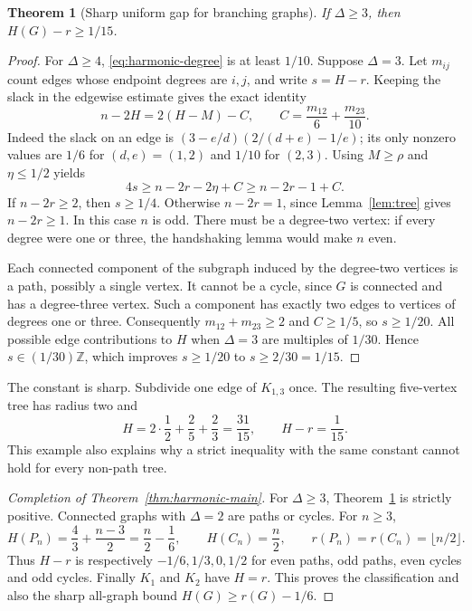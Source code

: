 \documentclass[11pt,a4paper]{article}
\newtheorem{theorem}{Theorem}[section]
\begin{document}
\begin{theorem}[Sharp uniform gap for branching graphs]\label{thm:gap}
If $\Delta\ge3$, then $H(G)-r\ge1/15$.
\end{theorem}
\begin{proof}
For $\Delta\ge4$, \eqref{eq:harmonic-degree} is at least $1/10$.
Suppose $\Delta=3$. Let $m_{ij}$ count edges whose endpoint
degrees are $i,j$, and write $s=H-r$. Keeping the slack in the
edgewise estimate gives the exact identity
\[
n-2H=2(H-M)-C,\qquad
C=\frac{m_{12}}6+\frac{m_{23}}{10}.
\]
Indeed the slack on an edge is
$(3-e/d)(2/(d+e)-1/e)$; its only nonzero values are
$1/6$ for $(d,e)=(1,2)$ and $1/10$ for $(2,3)$.
Using $M\ge\rho$ and $\eta\le1/2$ yields
\[
4s\ge n-2r-2\eta+C\ge n-2r-1+C.
\]
If $n-2r\ge2$, then $s\ge1/4$. Otherwise $n-2r=1$, since
Lemma~\ref{lem:tree} gives $n-2r\ge1$. In this case $n$ is odd.
There must be a degree-two vertex: if every degree were one or
three, the handshaking lemma would make $n$ even.

Each connected component of the subgraph induced by the degree-two
vertices is a path, possibly a single vertex. It cannot be a cycle,
since $G$ is connected and has a degree-three vertex. Such a component
has exactly two edges to vertices of degrees one or three.
Consequently $m_{12}+m_{23}\ge2$ and $C\ge1/5$, so $s\ge1/20$.
All possible edge contributions to $H$ when $\Delta=3$ are multiples
of $1/30$. Hence $s\in(1/30)\mathbb Z$, which improves
$s\ge1/20$ to $s\ge2/30=1/15$.
\end{proof}

The constant is sharp. Subdivide one edge of $K_{1,3}$ once.
The resulting five-vertex tree has radius two and
\[
H=2\cdot\frac12+\frac25+\frac23=\frac{31}{15},
\qquad H-r=\frac1{15}.
\]
This example also explains why a strict inequality with the same
constant cannot hold for every non-path tree.

\begin{proof}[Completion of Theorem~\ref{thm:harmonic-main}]
For $\Delta\ge3$, Theorem~\ref{thm:gap} is strictly positive.
Connected graphs with $\Delta=2$ are paths or cycles. For $n\ge3$,
\[
H(P_n)=\frac43+\frac{n-3}{2}=\frac n2-\frac16,
\qquad H(C_n)=\frac n2,
\qquad r(P_n)=r(C_n)=\lfloor n/2\rfloor.
\]
Thus $H-r$ is respectively $-1/6,1/3,0,1/2$ for even paths,
odd paths, even cycles and odd cycles. Finally $K_1$ and $K_2$
have $H=r$. This proves the classification and also the sharp
all-graph bound $H(G)\ge r(G)-1/6$.
\end{proof}
\end{document}
